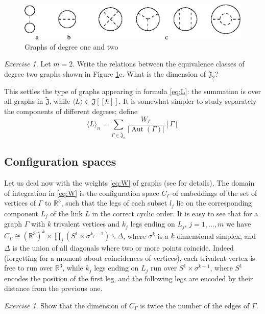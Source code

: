 \documentclass[10pt]{amsart}
\theoremstyle{definition}
\theoremstyle{remark}
\newtheorem{exs}[thm]{Exercise}
\newcommand{\R}{\mathbb R}
\newcommand{\sminus}{\smallsetminus}
\newcommand{\bJ}{\widetilde{\mathfrak{J}}}
\newcommand{\J}{\mathfrak{J}}
\def\<{\langle}
\def\>{\rangle}
\newcommand{\h}{\hbar}
\newcommand{\GD}{\Delta}
\newcommand{\GG}{\Gamma}
\newcommand{\Gs}{\sigma}
\newcommand{\Aut}{\operatorname{Aut}}
\begin{document}
\begin{figure}[htb]
\includegraphics[width=5.0in]{xyz.eps}
\caption{Graphs of degree one and two} \label{fig:xyz}
\end{figure}

\begin{exs}
Let $m=2$. Write the relations between the equivalence classes of
degree two graphs shown in Figure \ref{fig:xyz}c. What is the
dimension of $\J_2$?
\end{exs}

This settles the type of graphs appearing in formula \eqref{eq:L}:
the summation is over all graphs in $\bJ$, while
$\<L\>\in\J[[\h]]$. It is somewhat simpler to study separately the
components of different degrees; define
\begin{equation}\label{eq:Ln}
\<L\>_n=\sum_{\GG\in\bJ_n}\frac{W_\GG}{|\Aut(\GG)|}[\GG]
\end{equation}

\subsection{Configuration spaces}
Let us deal now with the weights \eqref{eq:W} of graphs
(see \cite{BT, Poi, T} for details).
The domain of integration in \eqref{eq:W} is the configuration space
$C_\GG$ of embeddings of the set of vertices of $\GG$ to $\R^3$,
such that the legs of each subset $l_j$ lie on the corresponding
component $L_j$ of the link $L$ in the correct cyclic order. It is
easy to see that for a graph $\GG$ with $k$ trivalent vertices and
$k_j$ legs ending on $L_j$, $j=1,\dots,m$ we have
$C_\GG\cong(\R^3)^k\times\prod_j (S^1 \times \Gs^{k_j-1})
\sminus\GD$, where $\Gs^k$ is a $k$-dimensional simplex, and $\GD$
is the union of all diagonals where two or more points coincide.
Indeed (forgetting for a moment about coincidences of vertices),
each trivalent vertex is free to run over $\R^3$, while $k_j$ legs
ending on $L_j$ run over $S^1\times\Gs^{k-1}$, where $S^1$ encodes
the position of the first leg, and the following legs are encoded
by their distance from the previous one.
\begin{exs}\label{exs:count}
Show that the dimension of $C_\GG$ is twice the number of the
edges of $\GG$.
\end{exs}
\end{document}
